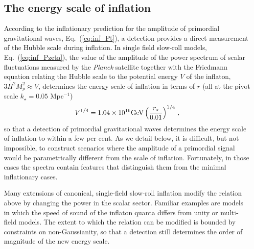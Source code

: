 

\subsection{The energy scale of inflation}
\label{sec:scale-of-inflation}
According to the inflationary prediction for the amplitude of primordial gravitational waves, Eq.~(\ref{eq:inf_Pt}), a detection provides a direct measurement of the Hubble scale during inflation. In single field slow-roll models, Eq.~(\ref{eq:inf_Pzeta}), the value of the amplitude of the power spectrum of scalar fluctuations measured by the {\it Planck} satellite together with the Friedmann equation relating the Hubble scale to the potential energy $V$ of the inflaton, $3H^2M_p^2\approx V$, determines the energy scale of inflation in terms of $r$ (all at the pivot scale $k_\star=0.05$ Mpc$^{-1}$)
\begin{equation}\label{eq:Vofr}
V^{1/4}=1.04\times 10^{16}{\rm GeV}\left(\frac{r_\star}{0.01}\right)^{1/4}\,,
\end{equation}
so that a detection of primordial gravitational waves determines the energy scale of inflation to within a few per cent. As we detail below, it is difficult, but not impossible, to construct scenarios where the amplitude of a primordial signal would be parametrically different from the scale of inflation. Fortunately, in those cases the spectra contain features that distinguish them from the minimal inflationary cases.

Many extensions of canonical, single-field slow-roll inflation modify the relation above by changing the power in the scalar sector. Familiar examples are models in which the speed of sound of the inflaton quanta differs from unity or multi-field models. The extent to which the relation can be modified is bounded by constraints on non-Gaussianity, so that a detection still determines the order of magnitude of the new energy scale.

